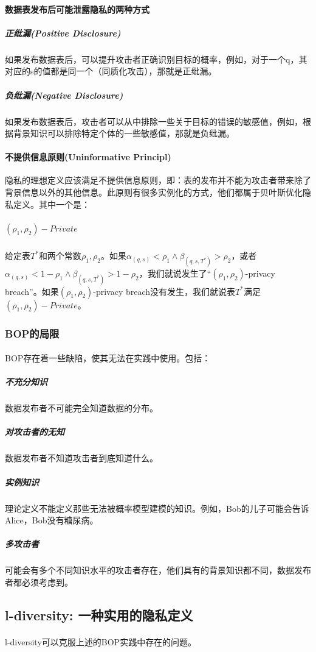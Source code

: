 \documentclass[12pt,a4paper]{article}
\begin{document}
\paragraph{数据表发布后可能泄露隐私的两种方式}
	\subparagraph{正纰漏(Positive Disclosure)} 如果发布数据表后，可以提升攻击者正确识别目标的概率，例如，对于一个q，其对应的s的值都是同一个（同质化攻击），那就是正纰漏。 
	\subparagraph{负纰漏(Negative Disclosure)} 如果发布数据表后，攻击者可以从中排除一些关于目标的错误的敏感值，例如，根据背景知识可以排除特定个体的一些敏感值，那就是负纰漏。
\paragraph{不提供信息原则(Uninformative Principl)} 隐私的理想定义应该满足不提供信息原则，即：表的发布并不能为攻击者带来除了背景信息以外的其他信息。此原则有很多实例化的方式，他们都属于贝叶斯优化隐私定义。其中一个是：
	\subparagraph{$(\rho_1, \rho_2)-Private$} 给定表$T^*$和两个常数$\rho_1,\rho_2$。如果$\alpha_{(q,s)} < \rho_1 \wedge \beta_{(q,s,T^*)} > \rho_2$，或者$\alpha_{(q,s)} < 1 - \rho_1 \wedge \beta_{(q,s,T^*)} > 1 - \rho_2$，我们就说发生了“$(\rho_1, \rho_2)$-privacy breach”。如果$(\rho_1, \rho_2)$-privacy breach没有发生，我们就说表$T^*$满足$(\rho_1, \rho_2)-Private$。

\subsubsection{BOP的局限}
	
\paragraph{} BOP存在着一些缺陷，使其无法在实践中使用。包括：
	\subparagraph{不充分知识} 数据发布者不可能完全知道数据的分布。
	\subparagraph{对攻击者的无知} 数据发布者不知道攻击者到底知道什么。
	\subparagraph{实例知识} 理论定义不能定义那些无法被概率模型建模的知识。例如，Bob的儿子可能会告诉Alice，Bob没有糖尿病。
	\subparagraph{多攻击者} 可能会有多个不同知识水平的攻击者存在，他们具有的背景知识都不同，数据发布者都必须考虑到。
	
\subsection{l-diversity: 一种实用的隐私定义}
\paragraph{} l-diversity可以克服上述的BOP实践中存在的问题。
\end{document}
